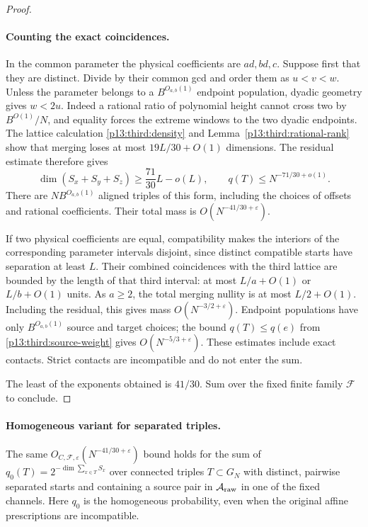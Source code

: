 \begin{proof}
\paragraph{Counting the exact coincidences.}
In the common parameter the physical coefficients are $ad,bd,c$.
Suppose first that they are distinct.  Divide by their common gcd
and order them as $u<v<w$.  Unless the parameter belongs to a
$B^{O_{a,b}(1)}$ endpoint population, dyadic geometry gives $w<2u$.
Indeed a rational ratio of polynomial height cannot cross two by
$B^{O(1)}/N$, and equality forces the extreme windows to the two
dyadic endpoints.
The lattice calculation \eqref{p13:third:density} and
Lemma~\ref{p13:third:rational-rank} show that merging loses at most
$19L/30+O(1)$ dimensions.  The residual estimate therefore gives
\[
 \dim(S_x+S_y+S_z)\geq\frac{71}{30}L-o(L),\qquad
 q(T)\leq N^{-71/30+o(1)}.
\]
There are $NB^{O_{a,b}(1)}$ aligned triples of this form, including the
choices of offsets and rational coefficients.  Their total mass is
$O(N^{-41/30+\varepsilon})$.

If two physical coefficients are equal, compatibility makes the
interiors of the corresponding parameter intervals disjoint, since
distinct compatible starts have separation at least $L$.
Their combined coincidences with the third lattice are bounded by the
length of that third interval: at most $L/a+O(1)$ or $L/b+O(1)$ units.
As $a\geq2$, the total merging nullity is at most $L/2+O(1)$.
Including the residual, this gives mass $O(N^{-3/2+\varepsilon})$.
Endpoint populations have only $B^{O_{a,b}(1)}$ source and target
choices; the bound $q(T)\leq q(e)$ from
\eqref{p13:third:source-weight} gives $O(N^{-5/3+\varepsilon})$.
These estimates include exact contacts.  Strict contacts are incompatible
and do not enter the sum.

The least of the exponents obtained is $41/30$.  Sum over the fixed
finite family $\mathcal F$ to conclude.
\end{proof}


\paragraph{Homogeneous variant for separated triples.}
The same $O_{C,\mathcal F,\varepsilon}(N^{-41/30+\varepsilon})$ bound
holds for the sum of
$q_0(T)=2^{-\dim\sum_{x\in T}S_x}$ over connected triples
$T\subset G_N$ with distinct, pairwise separated starts and containing
a source pair in $\mathcal A_{\rm raw}$ in one of the fixed channels.
Here $q_0$ is the homogeneous probability, even when the original affine
prescriptions are incompatible.

